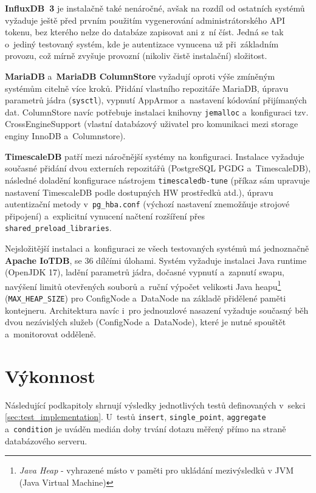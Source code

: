 \textbf{InfluxDB~3} je instalačně také nenáročné, avšak na rozdíl od ostatních systémů vyžaduje ještě před prvním použitím vygenerování administrátorského API tokenu, bez 
kterého nelze do databáze zapisovat ani z~ní číst. 
Jedná se tak o~jediný testovaný systém, kde je autentizace vynucena už při~základním provozu, což mírně zvyšuje provozní (nikoliv čistě instalační) složitost.

\textbf{MariaDB} a~\textbf{MariaDB ColumnStore} vyžadují oproti výše zmíněným systémům citelně více kroků. Přidání vlastního repozitáře MariaDB, úpravu parametrů jádra (\texttt{sysctl}), vypnutí AppArmor a~nastavení kódování přijímaných dat. 
ColumnStore navíc potřebuje instalaci knihovny \texttt{jemalloc} a~konfiguraci tzv. CrossEngineSupport (vlastní databázový uživatel pro komunikaci mezi storage enginy InnoDB 
a~Columnstore).

\textbf{TimescaleDB} patří mezi náročnější systémy na konfiguraci. 
Instalace vyžaduje současné přidání dvou externích repozitářů (PostgreSQL PGDG a~TimescaleDB), následné doladění konfigurace nástrojem \texttt{timescaledb-tune} (příkaz sám upravuje nastavení TimescaleDB podle dostupných HW prostředků atd.), úpravu autentizační metody v~\texttt{pg\_hba.conf} (výchozí nastavení znemožňuje strojové připojení) a~explicitní vynucení načtení rozšíření přes \texttt{shared\_preload\_libraries}.

Nejsložitější instalaci a~konfiguraci ze všech testovaných systémů má jednoznačně \textbf{Apache IoTDB}, se 36 dílčími úlohami. 
Systém vyžaduje instalaci Java runtime (OpenJDK 17), ladění parametrů jádra, dočasné vypnutí a~zapnutí swapu, navýšení limitů otevřených souborů a~ruční výpočet velikosti Java heapu\footnote{\textit{Java Heap} - vyhrazené místo v paměti pro ukládání mezivýsledků v JVM (Java Virtual Machine)} (\texttt{MAX\_HEAP\_SIZE}) pro ConfigNode a~DataNode na základě přidělené paměti kontejneru.
Architektura navíc i~pro jednouzlové nasazení vyžaduje současný běh dvou nezávislých služeb (ConfigNode a~DataNode), které je nutné spouštět a~monitorovat odděleně.

\section{Výkonnost}\label{sec:performance}
Následující podkapitoly shrnují výsledky jednotlivých testů definovaných 
v~sekci \ref{sec:test_implementation}. U~testů \texttt{insert}, 
\texttt{single\_point}, \texttt{aggregate} a~\texttt{condition} je uváděn 
medián doby trvání dotazu měřený přímo na straně databázového serveru. 

